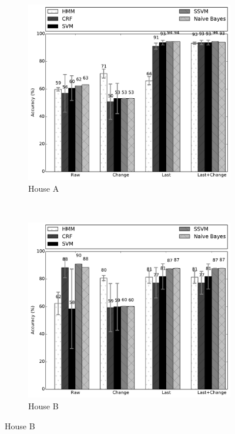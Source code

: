 \begin{figure}
	\centering
	\begin{subfigure}[b]{0.4\textwidth}
		\includegraphics[height=\textwidth]{../../src/reports/A.pdf}
		\caption{House A}
		\label{fig:chouseA}
	\end{subfigure}
	~~\hspace{1in}
	\begin{subfigure}[b]{0.4\textwidth}
		\includegraphics[height=\textwidth]{../../src/reports/B.pdf}
		\caption{House B}
		\label{fig:chouseB}
	\end{subfigure}
	

\end{figure}
